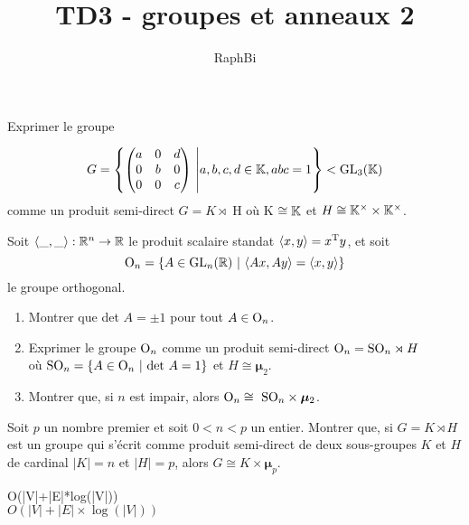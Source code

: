 \documentclass[french,a4paper,10pt]{article}
\title{\color{astral} \sffamily \bfseries TD3 - groupes et anneaux 2}
\author{RaphBi}
\begin{document}
    \maketitle
    \begin{td-exo}[1]
        Exprimer le groupe

        $$G = \left\{\begin{pmatrix}
            a & 0 & d\\
            0 & b & 0\\
            0 & 0 & c \end{pmatrix}\ 
            \middle| a,b,c,d \in \bb K, abc=1\right\} < \textmd{GL}_3(\bb K)$$
        comme un produit semi-direct $G = K \rtimes$ H où K $\cong \mathbb{K}$ et $H \cong \mathbb{K}^\times \times \mathbb{K}^\times$.
    \end{td-exo}

    \begin{td-exo}[2]
        Soit $\langle \_,\_\rangle: \mathbb{R}^n \rightarrow \mathbb{R}$ le produit scalaire standat $\langle x,y\rangle = x^\textmd{T}y$, et soit
        $$\textmd{O}_n = \left\{ A\in \textmd{GL}_n(\mathbb{R})\ | \ \langle Ax,Ay\rangle = \langle x,y \rangle \right\}$$ le groupe orthogonal.
        \begin{enumerate}[($i$)]
            \item Montrer que det $A = \pm 1$ pour tout $A\in \textmd{O}_n$.
            \item Exprimer le groupe $\textmd{O}_n$ comme un produit semi-direct $\textmd{O}_n = \textmd{SO}_n \rtimes H$\\
            où $\textmd{SO}_n = \{A\in \textmd{O}_n \ | \ \textmd{det} \ A = 1\}$ et $H \cong \bm{\mu}_2$.
            \item Montrer que, si $n$ est impair, alors $\textmd{O}_n \cong \ \textmd{SO}_n \times \bm{\mu}_2$.
        \end{enumerate}
    \end{td-exo}

    \begin{td-exo}[3]
        Soit $p$ un nombre premier et soit $0<n<p$ un entier. Montrer que, si $G = K \rtimes H$ est un groupe qui s'écrit comme produit
        semi-direct de deux sous-groupes $K$ et $H$ de cardinal $|K| = n$ et $|H|=p$, alors $G \cong K \times \bm{\mu}_p$.
    \end{td-exo}
    O(|V|+|E|*log(|V|))\\
    $O(\lvert V \rvert + \lvert E \rvert \times \log(\lvert V \rvert))$
    
\end{document}
